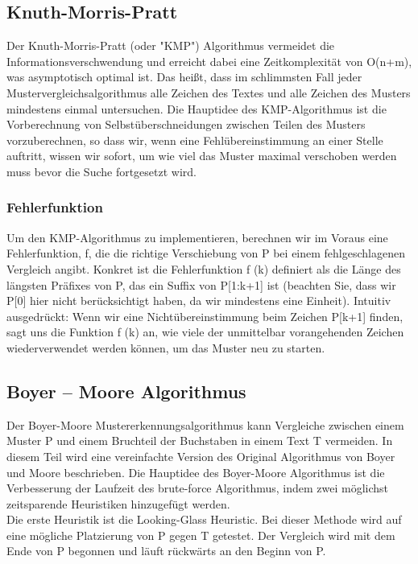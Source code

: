 \documentclass[14pt]{article}
\begin{document}
\subsection{Knuth-Morris-Pratt}

Der Knuth-Morris-Pratt (oder "KMP") Algorithmus vermeidet die Informationsverschwendung und erreicht dabei eine Zeitkomplexität von O(n+m), was asymptotisch optimal ist. Das heißt, dass im schlimmsten Fall jeder Mustervergleichsalgorithmus alle Zeichen des Textes und alle Zeichen des Musters mindestens einmal untersuchen. Die Hauptidee des KMP-Algorithmus ist die Vorberechnung von Selbstüberschneidungen zwischen Teilen des Musters vorzuberechnen, so dass wir, wenn eine Fehlübereinstimmung an einer Stelle auftritt, wissen wir sofort, um wie viel das Muster maximal verschoben werden muss bevor die Suche fortgesetzt wird.
\subsubsection{Fehlerfunktion}
Um den KMP-Algorithmus zu implementieren, berechnen wir im Voraus eine Fehlerfunktion, f, die die richtige Verschiebung von P bei einem fehlgeschlagenen Vergleich angibt. Konkret ist die Fehlerfunktion f (k) definiert als die Länge des längsten Präfixes von P, das ein Suffix von P[1:k+1] ist (beachten Sie, dass wir P[0] hier nicht berücksichtigt haben, da wir mindestens eine Einheit). Intuitiv ausgedrückt: Wenn wir eine Nichtübereinstimmung beim Zeichen P[k+1] finden, sagt uns die Funktion f (k) an, wie viele der unmittelbar vorangehenden Zeichen wiederverwendet werden können, um das Muster neu zu starten.


\subsection{Boyer – Moore Algorithmus}
Der Boyer-Moore Mustererkennungsalgorithmus kann Vergleiche zwischen einem Muster P und einem Bruchteil der Buchstaben in einem Text T vermeiden. In diesem Teil wird eine vereinfachte Version des Original Algorithmus von Boyer und Moore beschrieben.
Die Hauptidee des Boyer-Moore Algorithmus ist die Verbesserung der Laufzeit  des brute-force Algorithmus, indem zwei möglichst zeitsparende Heuristiken hinzugefügt werden. \\

Die erste Heuristik ist die Looking-Glass Heuristic. Bei dieser Methode wird auf eine mögliche Platzierung von P gegen T getestet. Der Vergleich wird mit dem Ende von P begonnen und läuft rückwärts an den Beginn von P.\\
\end{document}
